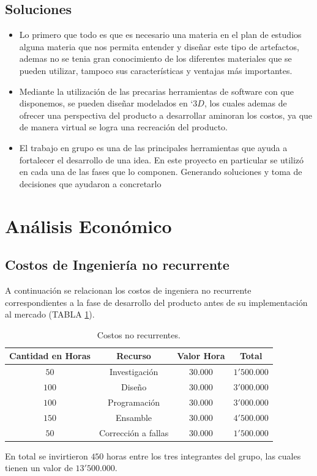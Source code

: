 \documentclass[twocolumn]{IEEEtran}
\begin{document}
\subsection{Soluciones}
\begin{itemize}
 \item Lo primero que todo es que es necesario una materia en el plan de estudios alguna materia que nos permita entender y diseñar este tipo de artefactos, ademas no se tenia gran conocimiento de los diferentes materiales que se pueden utilizar, tampoco sus características y ventajas más importantes.
 \item Mediante la utilización de las precarias herramientas de software con que disponemos, se pueden diseñar modelados en `$3D$, los cuales ademas de ofrecer una perspectiva del producto a desarrollar aminoran los costos, ya que de manera virtual se logra una recreación del producto.
 \item El trabajo en grupo es una de las principales herramientas que ayuda a fortalecer el desarrollo de una idea. En este proyecto en particular se utilizó en cada una de las fases que lo componen. Generando soluciones y toma de decisiones que ayudaron a concretarlo 
\end{itemize}



\section{Análisis Económico}
\noindent
\subsection{Costos de Ingeniería no recurrente}
\noindent
A continuación se relacionan los costos de ingeniera no recurrente correspondientes a la fase de desarrollo del producto antes de su implementación al mercado (TABLA \ref{tab1}).
\begin{table}[H]
	\centering
\begin{tabular}{|c|c|c|c|}\hline
 \textbf{Cantidad en Horas} & \textbf{Recurso} & \textbf{Valor Hora} & \textbf{Total} \\ \hline
 $50$ & Investigación & $30.000$ & $1'500.000$ \\ \hline
 $100$ & Diseño & $30.000$ & $3'000.000$ \\ \hline
 $100$ & Programación & $30.000$ & $3'000.000$ \\ \hline
 $150$ & Ensamble & $30.000$ & $4'500.000$ \\ \hline
 $50$ & Corrección a fallas & $30.000$ & $1'500.000$ \\ \hline
    \end{tabular}
	\caption{Costos no recurrentes.}
	\label{tab1}
\end{table}
\noindent
En total se invirtieron $450$ horas entre los tres integrantes del grupo, las cuales tienen un valor de $13'500.000$.
\end{document}
